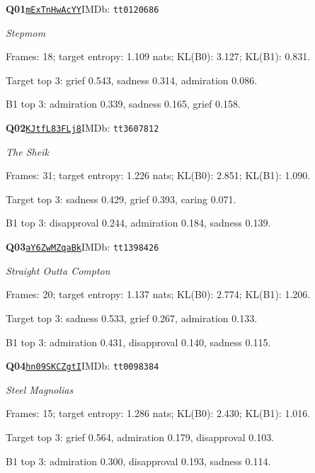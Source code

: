 \par\noindent\begin{minipage}{\textwidth}\small
\textbf{Q01}\quad\href{https://www.youtube.com/watch?v=mExTnHwAcYY}{\texttt{mExTnHwAcYY}}\quad IMDb: \texttt{tt0120686}\par
\textit{Stepmom}\par
Frames: 18; target entropy: 1.109 nats; KL(B0): 3.127; KL(B1): 0.831.\par
Target top 3: grief 0.543, sadness 0.314, admiration 0.086.\par
B1 top 3: admiration 0.339, sadness 0.165, grief 0.158.\par
\end{minipage}\par\medskip
\par\noindent\begin{minipage}{\textwidth}\small
\textbf{Q02}\quad\href{https://www.youtube.com/watch?v=KJtfL83FLj8}{\texttt{KJtfL83FLj8}}\quad IMDb: \texttt{tt3607812}\par
\textit{The Sheik}\par
Frames: 31; target entropy: 1.226 nats; KL(B0): 2.851; KL(B1): 1.090.\par
Target top 3: sadness 0.429, grief 0.393, caring 0.071.\par
B1 top 3: disapproval 0.244, admiration 0.184, sadness 0.139.\par
\end{minipage}\par\medskip
\par\noindent\begin{minipage}{\textwidth}\small
\textbf{Q03}\quad\href{https://www.youtube.com/watch?v=aY6ZwMZqaBk}{\texttt{aY6ZwMZqaBk}}\quad IMDb: \texttt{tt1398426}\par
\textit{Straight Outta Compton}\par
Frames: 20; target entropy: 1.137 nats; KL(B0): 2.774; KL(B1): 1.206.\par
Target top 3: sadness 0.533, grief 0.267, admiration 0.133.\par
B1 top 3: admiration 0.431, disapproval 0.140, sadness 0.115.\par
\end{minipage}\par\medskip
\par\noindent\begin{minipage}{\textwidth}\small
\textbf{Q04}\quad\href{https://www.youtube.com/watch?v=hn09SKCZgtI}{\texttt{hn09SKCZgtI}}\quad IMDb: \texttt{tt0098384}\par
\textit{Steel Magnolias}\par
Frames: 15; target entropy: 1.286 nats; KL(B0): 2.430; KL(B1): 1.016.\par
Target top 3: grief 0.564, admiration 0.179, disapproval 0.103.\par
B1 top 3: admiration 0.300, disapproval 0.193, sadness 0.114.\par
\end{minipage}\par\medskip
